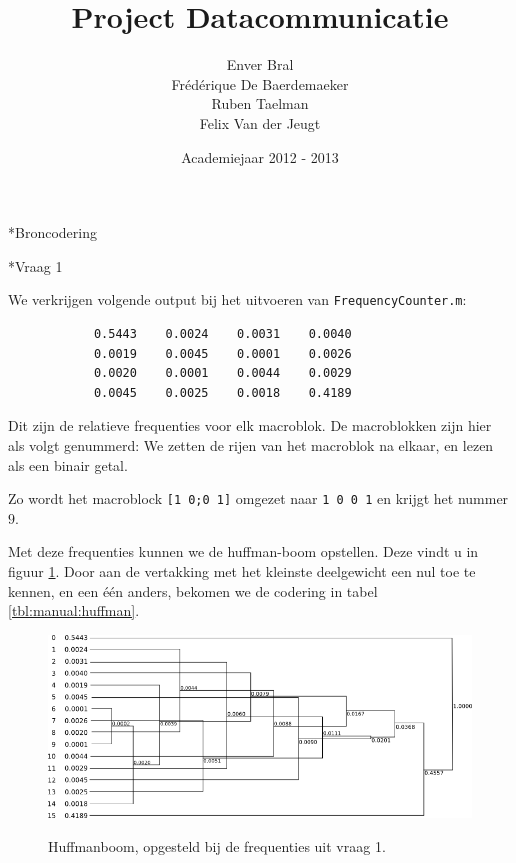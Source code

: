 \documentclass[]{article}
\begin{document}
\title{Project Datacommunicatie}
\author{Enver Bral \\ Fr\'ed\'erique De Baerdemaeker \\ Ruben Taelman \\ Felix Van der Jeugt}
\date{Academiejaar 2012 - 2013}
\maketitle

\begin{section}*{Broncodering}

    \begin{subsection}*{Vraag 1}

        We verkrijgen volgende output bij het uitvoeren van
        \texttt{FrequencyCounter.m}:

        \begin{lstlisting}
            0.5443    0.0024    0.0031    0.0040
            0.0019    0.0045    0.0001    0.0026
            0.0020    0.0001    0.0044    0.0029
            0.0045    0.0025    0.0018    0.4189
        \end{lstlisting}

        Dit zijn de relatieve frequenties voor elk macroblok. De
        macroblokken zijn hier als volgt genummerd: We zetten de rijen
        van het macroblok na elkaar, en lezen als een binair getal.

        Zo wordt het macroblock \texttt{[1 0;0 1]} omgezet naar
        \texttt{1 0 0 1} en krijgt het nummer $9$.

        Met deze frequenties kunnen we de huffman-boom opstellen. Deze
        vindt u in figuur \ref{fig:manual:huffman}. Door aan de
        vertakking met het kleinste deelgewicht een nul toe te kennen,
        en een \'e\'en anders, bekomen we de codering in tabel
        \ref{tbl:manual:huffman}.

        \begin{figure}
            \centering
            \includegraphics[width=\textwidth]{manual_huffman.png}
            \label{fig:manual:huffman}
            \caption{Huffmanboom, opgesteld bij de frequenties uit
            vraag 1.}
        \end{figure}


\end{subsection}
\end{section}
\end{document}
